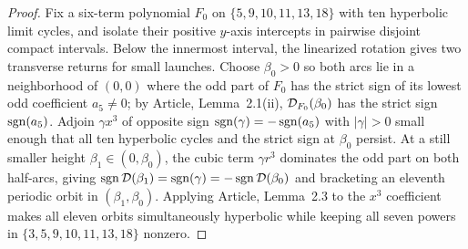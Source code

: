 \begin{proof}
Fix a six-term polynomial $F_0$ on $\{5,9,10,11,13,18\}$ with ten hyperbolic limit cycles, and isolate
their positive $y$-axis intercepts in pairwise disjoint compact intervals. Below the innermost
interval, the linearized rotation gives two transverse returns for
small launches. Choose $\beta_0>0$ so both arcs lie in a neighborhood of
$(0,0)$ where the odd part of $F_0$ has the strict sign of its lowest odd coefficient $a_5\ne 0$; by
Article, Lemma~2.1(ii), $\mathcal{D}_{F_0}(\beta_0)$ has the strict sign $\operatorname{sgn}(a_5)$. Adjoin
$\gamma x^3$ of opposite sign $\operatorname{sgn}(\gamma)=-\operatorname{sgn}(a_5)$ with $|\gamma|>0$ small enough that all ten
hyperbolic cycles and the strict sign at $\beta_0$ persist. At a still smaller height
$\beta_1\in(0,\beta_0)$, the cubic term $\gamma r^3$ dominates the odd part on both half-arcs, giving
$\operatorname{sgn}\mathcal{D}(\beta_1)=\operatorname{sgn}(\gamma)=-\operatorname{sgn}\mathcal{D}(\beta_0)$ and bracketing an eleventh periodic orbit in
$(\beta_1,\beta_0)$. Applying Article, Lemma~2.3 to the $x^3$ coefficient makes all eleven
orbits simultaneously hyperbolic while keeping all seven powers in $\{3,5,9,10,11,13,18\}$ nonzero.
\end{proof}
